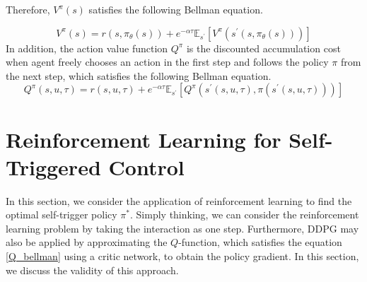 \documentclass[english, dvipdfmx]{ampmt}             %
\newcommand{\expect}{\mathbb{E}}
\begin{document}
Therefore, $V^{\pi}(s)$ satisfies the following Bellman equation. \par
\begin{equation}
	V^{\pi}(s) = r(s,\pi_{\theta}(s)) + e^{-\alpha\tau}\expect_{s^{\prime}}[V^{\pi}(s^{\prime}(s,\pi_{\theta}(s)))] \label{bellman}
\end{equation}
In addition, the action value function $Q^{\pi}$ is the discounted accumulation cost when agent freely chooses an action in the first step and follows the policy $\pi$ from the next step, which satisfies the following Bellman equation.
\begin{equation}
	Q^{\pi}(s,u,\tau) = r(s,u,\tau) + e^{-\alpha\tau}\expect_{s^{\prime}}[Q^{\pi}(s^{\prime}(s,u,\tau), \pi(s^{\prime}(s,u,\tau)))] \label{Q_bellman}
\end{equation}


\section{Reinforcement Learning for Self-Triggered Control}
In this section, we consider the application of reinforcement learning to find the optimal self-trigger policy $\pi^{*}$. Simply thinking, we can consider the reinforcement learning problem by taking the interaction as one step. Furthermore, DDPG may also be applied by approximating the $Q$-function, which satisfies the equation \eqref{Q_bellman} using a critic network, to obtain the policy gradient. In this section, we discuss the validity of this approach.
\end{document}
